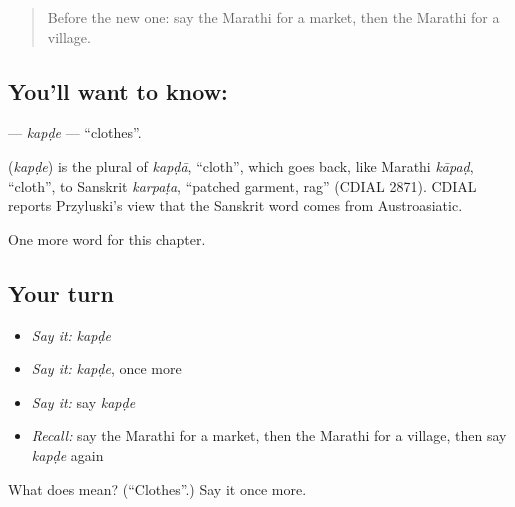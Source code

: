 \begin{quote}
Before the new one: say the Marathi for a market, then the Marathi for a village.
\end{quote}

\subsection*{You'll want to know: }
\textbf{} — \emph{kapḍe} — \textquotedblleft{}clothes\textquotedblright{}.

\begin{cousinweb}
\textbf{} (\emph{kapḍe}) is the plural of \emph{kapḍā}, \textquotedblleft{}cloth\textquotedblright{}, which goes back, like Marathi \emph{kāpaḍ}, \textquotedblleft{}cloth\textquotedblright{}, to Sanskrit \emph{karpaṭa}, \textquotedblleft{}patched garment, rag\textquotedblright{} (CDIAL 2871). CDIAL reports Przyluski's view that the Sanskrit word comes from Austroasiatic.
\end{cousinweb}

\begin{grammarlens}[title={What you've built}]
One more word for this chapter.
\end{grammarlens}

\subsection*{Your turn}
\begin{itemize}
\raggedright
  \item \emph{Say it:} \emph{kapḍe}
  \item \emph{Say it:} \emph{kapḍe}, once more
  \item \emph{Say it:} say \emph{kapḍe}
  \item \emph{Recall:} say the Marathi for a market, then the Marathi for a village, then say \emph{kapḍe} again
\end{itemize}

\begin{tcolorbox}[breakable,colback=teal!4,colframe=teal!35!black,title={Before you move on}]
What does  mean? (\textquotedblleft{}Clothes\textquotedblright{}.) Say it once more.
\end{tcolorbox}
